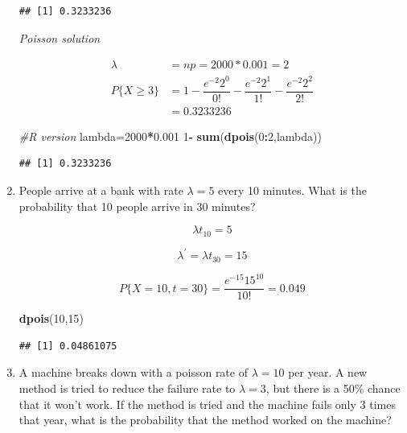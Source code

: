 \documentclass[]{book}
\newenvironment{Shaded}{\begin{snugshade}}{\end{snugshade}}
\newcommand{\CommentTok}[1]{\textcolor[rgb]{0.56,0.35,0.01}{\textit{#1}}}
\newcommand{\DecValTok}[1]{\textcolor[rgb]{0.00,0.00,0.81}{#1}}
\newcommand{\FloatTok}[1]{\textcolor[rgb]{0.00,0.00,0.81}{#1}}
\newcommand{\KeywordTok}[1]{\textcolor[rgb]{0.13,0.29,0.53}{\textbf{#1}}}
\newcommand{\NormalTok}[1]{#1}
\newcommand{\OperatorTok}[1]{\textcolor[rgb]{0.81,0.36,0.00}{\textbf{#1}}}
\newcommand{\StringTok}[1]{\textcolor[rgb]{0.31,0.60,0.02}{#1}}
\theoremstyle{definition}
\theoremstyle{definition}
\theoremstyle{definition}
\theoremstyle{remark}
\begin{document}
\begin{enumerate}
\begin{verbatim}
## [1] 0.3233236
\end{verbatim}

  \emph{Poisson solution}

  \begin{align*}
   \lambda &= np = 2000*0.001 = 2 \\
   P\{X \ge 3\} &= 1 - \dfrac{e^{-2}2^0}{0!} - \dfrac{e^{-2}2^1}{1!} - \dfrac{e^{-2}2^2}{2!} \\
       &= 0.3233236
   \end{align*}

\begin{Shaded}
\begin{Highlighting}[]
\CommentTok{#R version}
\NormalTok{lambda=}\DecValTok{2000}\OperatorTok{*}\FloatTok{0.001}
\DecValTok{1}\OperatorTok{-}\StringTok{ }\KeywordTok{sum}\NormalTok{(}\KeywordTok{dpois}\NormalTok{(}\DecValTok{0}\OperatorTok{:}\DecValTok{2}\NormalTok{,lambda))}
\end{Highlighting}
\end{Shaded}

\begin{verbatim}
## [1] 0.3233236
\end{verbatim}
\item
  People arrive at a bank with rate \(\lambda = 5\) every 10 minutes.
  What is the probability that 10 people arrive in 30 minutes?

  \[\lambda t_{10} = 5\]

  \[\lambda^\prime = \lambda t_{30} = 15 \]

  \[P\{X = 10, t=30\} = \dfrac{e^{-15}15^{10}}{10!} =  0.049\]

\begin{Shaded}
\begin{Highlighting}[]
\KeywordTok{dpois}\NormalTok{(}\DecValTok{10}\NormalTok{,}\DecValTok{15}\NormalTok{)}
\end{Highlighting}
\end{Shaded}

\begin{verbatim}
## [1] 0.04861075
\end{verbatim}
\item
  A machine breaks down with a poisson rate of \(\lambda = 10\) per
  year. A new method is tried to reduce the failure rate to
  \(\lambda = 3\), but there is a 50\% chance that it won't work. If the
  method is tried and the machine fails only 3 times that year, what is
  the probability that the method worked on the machine?


\end{enumerate}
\end{document}

